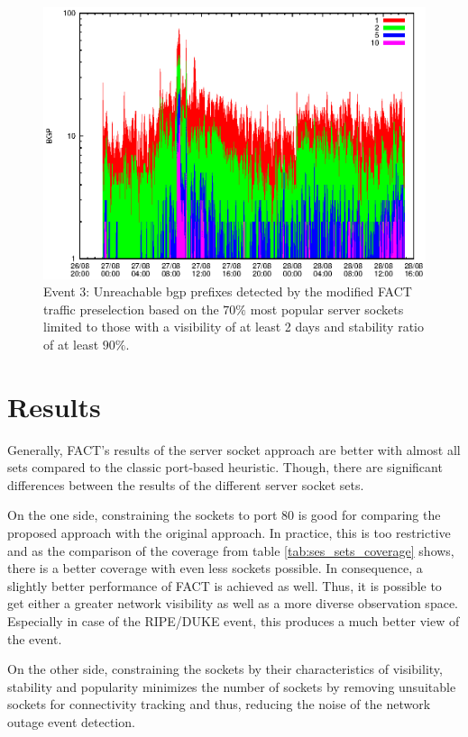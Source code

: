 \begin{figure}
	[p] \centering 
	\includegraphics[width=0.75\linewidth]{images/events/2010_08_27/bgp_log_Set_var_0_1_stab_9_vts_2.eps} \caption{Event 3: Unreachable \gls{bgp} prefixes detected by the modified \gls{FACT} traffic preselection based on the $70\%$ most popular \glspl{server socket} limited to those with a visibility of at least 2 days and stability ratio of at least $90\%$.} 
	\label{fig:RIPE_FACT_popularVTS2STAB9} 
\end{figure}

\newpage 
\section{Results\label{section:results}} 
Generally, \gls{FACT}'s results of the \gls{server socket} approach are better with almost all sets compared to the classic port-based heuristic. 
Though, there are significant differences between the results of the different \gls{server socket} sets. 

On the one side, constraining the sockets to port 80 is good for comparing the proposed approach with the original approach. In practice, this is too restrictive and as the comparison of the coverage from table \ref{tab:ses_sets_coverage} shows, there is a better coverage with even less sockets possible. In consequence, a slightly better performance of FACT is achieved as well. 
Thus, it is possible to get either a greater network visibility as well as a more diverse observation space. Especially in case of the RIPE/DUKE event, this produces a much better view of the event. 

On the other side, constraining the sockets by their characteristics of visibility, stability and popularity minimizes the number of sockets by removing unsuitable sockets for connectivity tracking and thus, reducing the noise of the network outage event detection.

